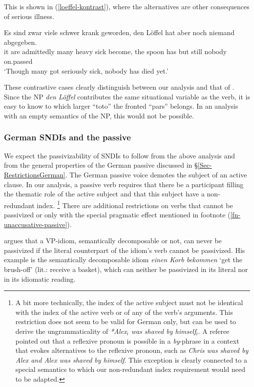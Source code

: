\documentclass[output=paper]{langsci/langscibook}
\begin{document}
This is shown in (\ref{loeffel-kontrast}), where the alternatives are other consequences of serious illness.

\ea
\gll Es sind zwar viele schwer krank geworden, den L\"offel hat aber noch niemand abgegeben.\\
it are admittedly many heavy sick become, the spoon has but still nobody on.passed\\
\glt `Though many got seriously sick, nobody has died yet.'\label{loeffel-kontrast}
\z

These contrastive cases clearly distinguish between our analysis and that of \cite{kaysagidioms}. Since the NP \textit{den L\"offel} contributes the same situational variable as the verb, it is easy to know to which larger ``toto'' the fronted ``pars'' belongs. In an analysis with an empty semantics of the NP, this would not be possible.



\subsubsection{German SNDIs and the passive}

We expect the passivizability of SNDIs to follow from the above analysis and from the general properties of the  German passive discussed in §\ref{Sec-RestrictionsGerman}. The German passive voice demotes the subject of an active clause. In our analysis, a passive verb requires that there be a participant filling the thematic role of the active subject and that this subject have a non-redundant index.%
\footnote{A bit more technically, the index of the active subject must not be identical with the index of the active verb or of any of the verb's arguments. This restriction does not seem to be valid for German only, but can be used to derive the ungrammaticality of \textit{*Alex$_i$ was shaved by himself$_i$}. A referee pointed out that a reflexive pronoun is possible in a \textit{by}-phrase in a context that evokes alternatives to the reflexive pronoun, such as \textit{Chris was shaved by Alex and Alex was shaved by himself}. This exception is clearly connected to a special semantics to which our non-redundant index requirement would need to be adapted.}
%
There are additional restrictions on verbs that cannot be passivized or only with the special pragmatic effect mentioned in footnote (\ref{fn-unaccusative-passive}).

\cite{Dobrovolskij:00}
argues that a VP-idiom,  semantically decomposable or not, can never be passivized if the literal counterpart of the idiom's verb cannot be passivized. His example is the semantically decomposable idiom \textit{einen Korb bekommen} `get the brush-off' (lit.: receive a basket), which can neither be passivized in its literal nor in its idiomatic reading.
\end{document}
